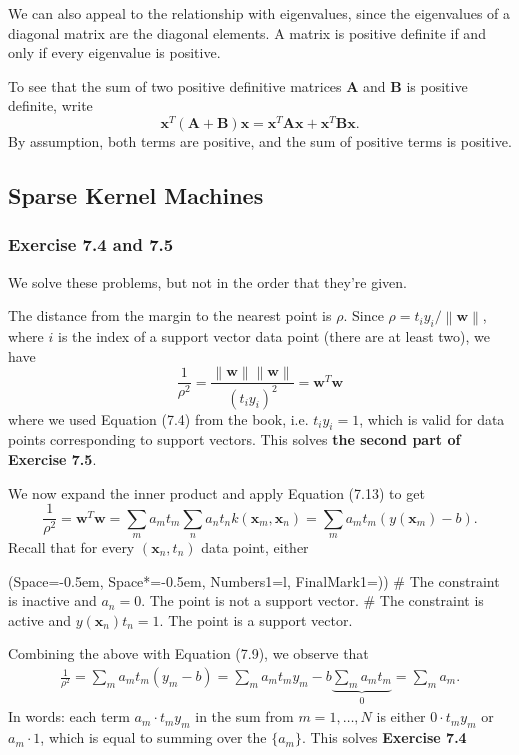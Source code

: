 \documentclass[12pt, a4paper]{article}
\newcommand{\listSpace}{-0.5em}%
\newcommand{\vect}[1]{\bm{#1}}
\newcommand{\norm}[1]{\left\lVert#1\right\rVert}
\begin{document}
We can also appeal to the relationship with eigenvalues, since the eigenvalues of a diagonal matrix are the diagonal elements.
A matrix is positive definite if and only if every eigenvalue is positive.

To see that the sum of two positive definitive matrices $\vect{A}$ and $\vect{B}$ is positive definite, write
\begin{equation*}
	\vect{x}^T ( \vect{A} + \vect{B} ) \vect{x} = 
	\vect{x}^T \vect{A} \vect{x} + 
	\vect{x}^T \vect{B} \vect{x}.
\end{equation*}
By assumption, both terms are positive, and the sum of positive terms is positive.



\subsection{Sparse Kernel Machines}
\subsubsection*{Exercise 7.4 and 7.5}
We solve these problems, but not in the order that they're given.

The distance from the margin to the nearest point is $\rho$.
Since $\rho = t_i y_i / \norm{\vect{w}}$, where $i$ is the index of a support vector data point (there are at least two), we have
\begin{equation*}
	\frac{1}{\rho^2} = \frac{ \norm{\vect{w}} \norm{\vect{w}}}{(t_i y_i)^2}
	= \vect{w}^T \vect{w}
\end{equation*}
where we used Equation (7.4) from the book, i.e. $t_i y_i = 1$, which is valid for data points corresponding to support vectors.
This solves \textbf{the second part of Exercise 7.5}.

We now expand the inner product and apply Equation (7.13) to get
\begin{equation}
\label{eqn:ch7_prob5_a}
\frac{1}{\rho^2} 
= \vect{w}^T \vect{w}
=
\sum_m a_m t_m \sum_n a_n t_n k (\vect{x}_m, \vect{x}_n)
= \sum_m a_m t_m \left(  y(\vect{x}_m) - b \right).
\end{equation}
Recall that for every $(\vect{x}_n, t_n)$ data point, either
\begin{easylist}[enumerate]
	\ListProperties(Space=\listSpace, Space*=\listSpace, Numbers1=l, FinalMark1={)})
	# The constraint is inactive and $a_n = 0$. The point is not a support vector.
	# The constraint is active and $y(\vect{x}_n) t_n = 1$.
	The point is a support vector.
\end{easylist}
Combining the above with Equation (7.9), we observe that
\begin{align}
\label{eqn:ch7_prob5_b}
	\frac{1}{\rho^2} 
	= \sum_m a_m t_m \left(  y_m - b \right) 
	= \sum_m a_m t_m y_m - b \underbrace{\sum_m a_m t_m }_{0}
	= \sum_m a_m.
\end{align}
In words: each term $a_m \cdot t_m y_m$ in the sum from $m=1,\ldots, N$ is either $0 \cdot t_m y_m$ or $a_m \cdot 1$, which is equal to summing over the $\{a_m \}$.
This solves \textbf{Exercise 7.4}
\end{document}

